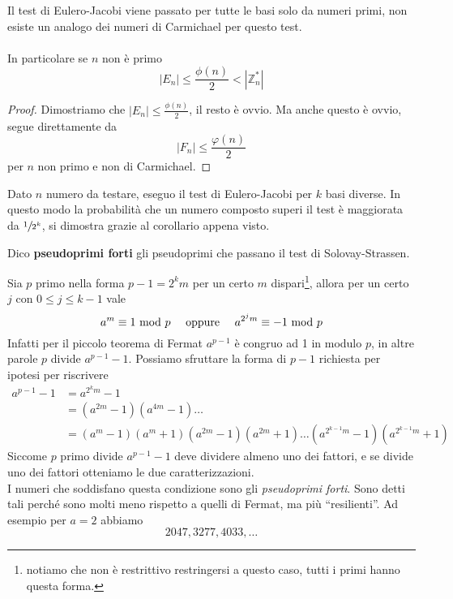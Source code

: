 \begin{corollario}
	Il test di Eulero-Jacobi viene passato per tutte le basi solo da numeri primi, non esiste un analogo dei numeri di Carmichael per questo test. \\ \\ In particolare se $n$ non è primo 
	\begin{equation*}
	\left|E_n\right|\leq\frac{\phi(n)}{2}<\left|\mathbb{Z}_n^*\right|
	\end{equation*}
\end{corollario}
\begin{proof}
	Dimostriamo che $\left|E_n\right|\leq\frac{\phi(n)}{2}$, il resto è ovvio. Ma anche questo è ovvio, segue direttamente da 
	\begin{equation*}
	\left|F_n\right|\leq\frac{\varphi(n)}{2}
	\end{equation*}
	per $n$ non primo e non di Carmichael.
\end{proof}
\begin{teorema}
	Dato $n$ numero da testare, eseguo il test di Eulero-Jacobi per $k$ basi diverse. In questo modo la probabilità che un numero composto superi il test è maggiorata da $\sfrac{1}{2^k}$, si dimostra grazie al corollario appena visto.
\end{teorema}
\begin{definizione}
	Dico \textbf{pseudoprimi forti} gli pseudoprimi che passano il test di Solovay-Strassen.
\end{definizione}
\begin{osservazione} 
	Sia $p$ primo nella forma $p-1=2^km$ per un certo $m$ dispari\footnote{notiamo che non è restrittivo restringersi a questo caso, tutti i primi hanno questa forma.}, allora per un certo $j$ con $0\leq j\leq k-1$ vale
	\begin{equation*}
	a^m\equiv1\Mod p \ \ \ \ \text{oppure}\ \ \ \ a^{2^jm}\equiv-1\Mod p
	\end{equation*}
	Infatti per il piccolo teorema di Fermat $a^{p-1}$ è congruo ad 1 in modulo $p$, in altre parole $p$ divide $a^{p-1}-1$. Possiamo sfruttare la forma di $p-1$ richiesta per ipotesi per riscrivere
	\begin{align*}
	a^{p-1}-1
	&=a^{2^km}-1\\
	&=\left(a^{2m}-1\right)\left(a^{4m}-1\right)\dots\\
	&=\left(a^{m}-1\right)\left(a^{m}+1\right)\left(a^{2m}-1\right)\left(a^{2m}+1\right)\dots\left(a^{2^{k-1}m}-1\right)\left(a^{2^{k-1}m}+1\right)
	\end{align*}
	Siccome $p$ primo divide $a^{p-1}-1$ deve dividere almeno uno dei fattori, e se divide uno dei fattori otteniamo le due caratterizzazioni.
	\\
	I numeri che soddisfano questa condizione sono gli \textit{pseudoprimi forti}. Sono detti tali perché sono molti meno rispetto a quelli di Fermat, ma più \enquote{resilienti}. Ad esempio per $a=2$ abbiamo
	\begin{equation*}
	2047,3277,4033,\dots
	\end{equation*}
\end{osservazione}





